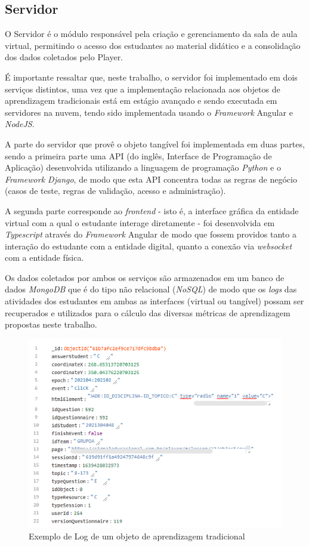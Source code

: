 \subsection{Servidor}

O Servidor é o módulo responsável pela criação e gerenciamento da sala de aula virtual, permitindo o acesso dos estudantes ao material didático e a consolidação dos dados coletados pelo Player. 

É importante ressaltar que, neste trabalho, o servidor foi implementado em dois serviços distintos, uma vez que a implementação relacionada aos objetos de aprendizagem tradicionais está em estágio avançado e sendo executada em servidores na nuvem, tendo sido implementada usando o \textit{Framework} Angular e \textit{NodeJS}.

A parte do servidor que provê o objeto tangível foi implementada em duas partes, sendo a primeira parte uma API (do inglês, Interface de Programação de Aplicação) desenvolvida utilizando a linguagem de programação \textit{Python} e o \textit{Framework Django}, de modo que esta API concentra todas as regras de negócio (casos de teste, regras de validação, acesso e administração). 

A segunda parte corresponde ao \textit{frontend} - isto é, a interface gráfica da entidade virtual com a qual o estudante interage diretamente - foi desenvolvida em \textit{Typescript} através do \textit{Framework} Angular de modo que fossem providos tanto a interação do estudante com a entidade digital, quanto a conexão via \textit{websocket} com a entidade física.

Os dados coletados por ambos os serviços são armazenados em um banco de dados \textit{MongoDB} que é do tipo não relacional (\textit{NoSQL}) de modo que os \textit{logs} das atividades dos estudantes em ambas as interfaces (virtual ou tangível) possam ser recuperados e utilizados para o cálculo das diversas métricas de aprendizagem propostas neste trabalho. 

\begin{figure}[htb]
	\centering
	\includegraphics[width=0.8\linewidth]{chapters/proposedMethod/tools/servidor_log.png}
	\caption{Exemplo de Log de um objeto de aprendizagem tradicional}
	\label{fig:servidor_log}
\end{figure}


